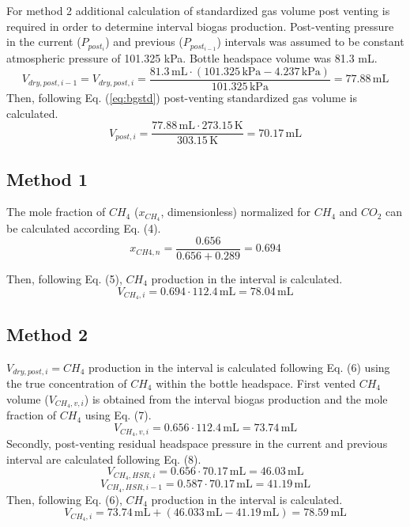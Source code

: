 \documentclass[]{article}
\newcommand{\unit}[1]{\ensuremath{\, \mathrm{#1}}}
\begin{document}
For method 2 additional calculation of standardized gas volume post venting is required in order to determine interval biogas production. 
Post-venting pressure in the current ($P_{post_{i}}$) and previous ($P_{post_{i-1}}$) intervals was assumed to be constant atmospheric pressure of 101.325 kPa. 
Bottle headspace volume was 81.3 mL. 
\begin{equation*}
   V_{dry,post,i-1} = V_{dry,post,i} = \frac{81.3\unit{mL} \cdot (101.325\unit{kPa} - 4.237\unit{kPa})}{101.325\unit{kPa}} = 77.88\unit{mL}  
\end{equation*}
Then, following Eq. (\ref{eq:bgstd}) post-venting standardized gas volume is calculated.
\begin{equation*}
    V_{post,i} = \frac{77.88\unit{mL} \cdot 273.15\unit{K}}{303.15\unit{K}} = 70.17\unit{mL}  
\end{equation*}

\subsection{Method 1}
The mole fraction of $CH_{4}$ ($x_{CH_4}$, dimensionless) normalized for $CH_{4}$ and $CO_{2}$ can be calculated according Eq. (4).
\begin{equation*}
    x_{CH{4},n} = \frac{0.656}{0.656 + 0.289} = 0.694
\end{equation*}

Then, following Eq. (5), $CH_{4}$ production in the interval is calculated.
\begin{equation*}
  V_{CH_4, i} = 0.694 \cdot 112.4\unit{mL}  = 78.04\unit{mL} 
\end{equation*}

\subsection{Method 2}
$V_{dry,post,i} =CH_{4}$ production in the interval is calculated following Eq. (6) using the true concentration of $CH_{4}$ within the bottle headspace.
First vented $CH_{4}$ volume ($V_{CH_4, v,i}$) is obtained from the interval biogas production and the mole fraction of $CH_{4}$ using Eq. (7).
\begin{equation*}
  V_{CH_4, v, i} = 0.656 \cdot 112.4\unit{mL}  = 73.74\unit{mL} 
\end{equation*}
Secondly, post-venting residual headspace pressure in the current and previous interval are calculated following Eq. (8).
\begin{equation*}
  V_{CH_4, HSR, i} = 0.656 \cdot 70.17\unit{mL}  = 46.03\unit{mL} 
\end{equation*}
\begin{equation*}
  V_{CH_4, HSR, i-1} = 0.587 \cdot 70.17\unit{mL}  = 41.19\unit{mL} 
\end{equation*}
Then, following Eq. (6), $CH_{4}$ production in the interval is calculated.
\begin{equation*}
  V_{CH_{4},i} = 73.74\unit{mL} + (46.033\unit{mL} - 41.19\unit{mL})  = 78.59\unit{mL} 
\end{equation*}


\end{document}
